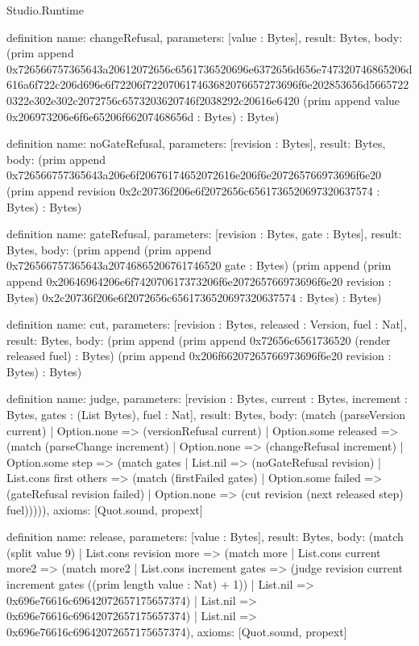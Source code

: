 \begin{lexlean}{Studio.Runtime}
\begin{semanticmodule}
definition{
  name: changeRefusal,
  parameters: [value : Bytes],
  result: Bytes,
  body: (prim append 0x726566757365643a20612072656c6561736520696e6372656d656e747320746865206d616a6f722c206d696e6f72206f722070617463682076657273696f6e202853656d56657220322e302e302c2072756c6573203620746f2038292c20616e6420 (prim append value 0x206973206e6f6e65206f66207468656d : Bytes) : Bytes)
}

definition{
  name: noGateRefusal,
  parameters: [revision : Bytes],
  result: Bytes,
  body: (prim append 0x726566757365643a206e6f20676174652072616e206f6e207265766973696f6e20 (prim append revision 0x2c20736f206e6f2072656c6561736520697320637574 : Bytes) : Bytes)
}

definition{
  name: gateRefusal,
  parameters: [revision : Bytes, gate : Bytes],
  result: Bytes,
  body: (prim append (prim append 0x726566757365643a20746865206761746520 gate : Bytes) (prim append (prim append 0x20646964206e6f742070617373206f6e207265766973696f6e20 revision : Bytes) 0x2c20736f206e6f2072656c6561736520697320637574 : Bytes) : Bytes)
}

definition{
  name: cut,
  parameters: [revision : Bytes, released : Version, fuel : Nat],
  result: Bytes,
  body: (prim append (prim append 0x72656c6561736520 (render released fuel) : Bytes) (prim append 0x206f66207265766973696f6e20 revision : Bytes) : Bytes)
}

definition{
  name: judge,
  parameters: [revision : Bytes, current : Bytes, increment : Bytes, gates : (List Bytes), fuel : Nat],
  result: Bytes,
  body: (match (parseVersion current)
    | Option.none => (versionRefusal current)
    | Option.some released => (match (parseChange increment)
      | Option.none => (changeRefusal increment)
      | Option.some step => (match gates
        | List.nil => (noGateRefusal revision)
        | List.cons first others => (match (firstFailed gates)
          | Option.some failed => (gateRefusal revision failed)
          | Option.none => (cut revision (next released step) fuel))))),
  axioms: [Quot.sound, propext]
}

definition{
  name: release,
  parameters: [value : Bytes],
  result: Bytes,
  body: (match (split value 9)
    | List.cons revision more => (match more
      | List.cons current more2 => (match more2
        | List.cons increment gates => (judge revision current increment gates ((prim length value : Nat) + 1))
        | List.nil => 0x696e76616c69642072657175657374)
      | List.nil => 0x696e76616c69642072657175657374)
    | List.nil => 0x696e76616c69642072657175657374),
  axioms: [Quot.sound, propext]
}


\end{semanticmodule}
\end{lexlean}
